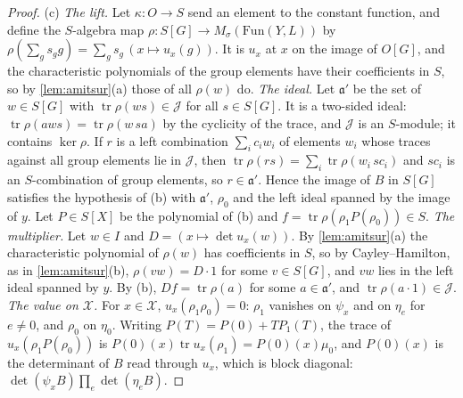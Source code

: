 \begin{proof}
(c) \emph{The lift.} Let $\kappa\colon O\to S$ send an element to the constant function, and define the $S$-algebra map $\rho\colon S[G]\to M_\sigma(\mathrm{Fun}(Y,L))$ by $\rho(\sum_gs_gg)=\sum_gs_g\,(x\mapsto u_x(g))$. It is $u_x$ at $x$ on the image of $O[G]$, and the
characteristic polynomials of the group elements have their coefficients in $S$, so by \cref{lem:amitsur}(a) those of all $\rho(w)$ do. \emph{The ideal.} Let $\mathfrak a'$ be the set of $w\in S[G]$ with $\operatorname{tr}\rho(ws)\in\mathcal J$ for all $s\in S[G]$. It is a
two-sided ideal: $\operatorname{tr}\rho(aws)=\operatorname{tr}\rho(w\,sa)$ by the cyclicity of the trace, and $\mathcal J$ is an $S$-module; it contains $\ker\rho$. If $r$ is a left combination $\sum_ic_iw_i$ of elements $w_i$ whose traces against all group elements lie in $\mathcal J$, then
$\operatorname{tr}\rho(rs)=\sum_i\operatorname{tr}\rho(w_i\,sc_i)$ and $sc_i$ is an $S$-combination of group elements, so $r\in\mathfrak a'$. Hence the image of $B$ in $S[G]$ satisfies the hypothesis of (b) with $\mathfrak a'$, $\rho_0$ and the left ideal spanned by
the image of $y$. Let $P\in S[X]$ be the polynomial of (b) and $f=\operatorname{tr}\rho(\rho_1P(\rho_0))\in S$. \emph{The multiplier.} Let $w\in I$ and $D=(x\mapsto\det u_x(w))$. By \cref{lem:amitsur}(a) the characteristic polynomial of $\rho(w)$ has
coefficients in $S$, so by Cayley--Hamilton, as in \cref{lem:amitsur}(b), $\rho(vw)=D\cdot1$ for some $v\in S[G]$, and $vw$ lies in the left ideal spanned by $y$. By (b), $Df=\operatorname{tr}\rho(a)$ for some $a\in\mathfrak a'$, and
$\operatorname{tr}\rho(a\cdot1)\in\mathcal J$. \emph{The value on $\mathcal X$.} For $x\in\mathcal X$, $u_x(\rho_1\rho_0)=0$: $\rho_1$ vanishes on $\psi_x$ and on $\eta_e$ for $e\ne0$, and $\rho_0$ on $\eta_0$. Writing $P(T)=P(0)+TP_1(T)$, the trace of
$u_x(\rho_1P(\rho_0))$ is $P(0)(x)\operatorname{tr}u_x(\rho_1)=P(0)(x)\mu_0$, and $P(0)(x)$ is the determinant of $B$ read through $u_x$, which is block diagonal: $\det(\psi_xB)\prod_e\det(\eta_eB)$.
\end{proof}

